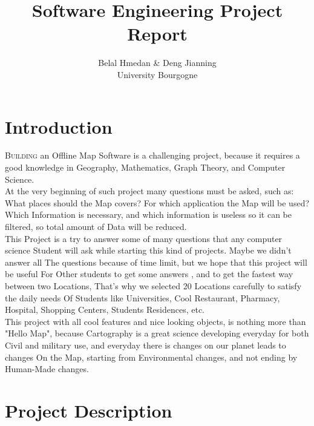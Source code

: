 \documentclass[a4paper, 12pt, english]{book}
\title{\textbf{Software Engineering Project Report}}
\begin{document}
\author{Belal Hmedan \& Deng Jianning\\University Bourgogne}
\maketitle
\let\cleardoublepage\clearpage
\tableofcontents
\chapter*{Introduction}
 
\lettrine{B}{uilding} an Offline Map Software is a challenging project, 
because it requires a good knowledge in Geography, Mathematics, 
Graph Theory, and Computer Science.\\

At the very beginning of such project many questions must be asked, such as: 
What places should the Map covers? For which application the Map will be used?
Which Information is necessary, and which information is useless so it can be 
filtered, so total amount of Data will be reduced.\\

This Project is a try to answer some of many questions that any computer 
science Student will ask while starting this kind of projects. Maybe we 
didn't answer all The questions because of time limit, but we hope that 
this project will be useful For Other students to get some answers , and 
to get the fastest way between two Locations, That's why we selected 20 
Locations carefully to satisfy the daily needs Of Students like Universities, 
Cool Restaurant, Pharmacy, Hospital, Shopping Centers, Students Residences, etc.\\

This project with all cool features and nice looking objects, is nothing more 
than "Hello Map", because Cartography is a great science developing everyday 
for both Civil and military use, and everyday there is changes on our planet 
leads to changes On the Map, starting from Environmental changes, and not ending 
by Human-Made changes. 

\chapter{Project Description}
\end{document}
